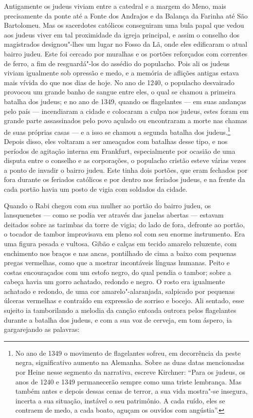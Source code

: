 Antigamente os judeus viviam entre a catedral e a margem do Meno, mais
precisamente da ponte até a Fonte dos Andrajos e da Balança da Farinha
até São Bartolomeu. Mas os sacerdotes católicos conseguiram uma bula
papal que vedou aos judeus viver em tal proximidade da igreja
principal, e assim o conselho dos magistrados designou"-lhes um lugar
no Fosso da Lã, onde eles edificaram o atual bairro judeu. Este foi
cercado por muralhas e os portões reforçados com correntes de ferro, a
fim de resguardá"-los do assédio do populacho. Pois ali os judeus
viviam igualmente sob opressão e medo, e a memória de aflições antigas
estava mais vívida do que nos dias de hoje. No ano de 1240, o populacho
desvairado provocou um grande banho de sangue entre eles, o qual se
chamou a primeira batalha dos judeus; e no ano de 1349, quando os
flagelantes --- em suas andanças pelo país --- incendiaram a cidade e
colocaram a culpa nos judeus, estes foram em grande parte assassinados
pelo povo açulado ou encontraram a morte nas chamas de suas próprias
casas ­--- e a isso se chamou a segunda batalha dos
judeus.\footnote{ No ano
de 1349 o movimento de flagelantes sofreu, em decorrência da peste
negra, significativo aumento na Alemanha. Sobre as duas datas
mencionadas por Heine nesse segmento da narrativa, escreve Kirchner:
``Para os judeus, os anos de 1240 e 1349 permanecerão sempre como uma
triste lembrança. Mas também antes e depois dessas cenas de terror, a
sua vida mostra"-se insegura, incerta a sua situação, instável o seu
patrimônio. A cada ruído, eles se contraem de medo, a cada boato,
aguçam os ouvidos com angústia''.}
 Depois disso, eles voltaram a ser ameaçados com batalhas desse tipo, e
nos períodos de agitação interna em Frankfurt, especialmente por
ocasião de uma disputa entre o conselho e as corporações, o populacho
cristão esteve várias vezes a ponto de invadir o bairro judeu. Este
tinha dois portões, que eram fechados por fora durante os feriados
católicos e por dentro nos feriados judeus, e na frente da cada portão
havia um posto de vigia com soldados da cidade.

Quando o Rabi chegou com sua mulher ao portão do bairro judeu, os
lansquenetes --- como se podia ver através das janelas abertas --- estavam
deitados sobre as tarimbas da torre de vigia; do lado de fora, defronte
ao portão, o tocador de tambor improvisava em pleno sol com seu enorme
instrumento. Era uma figura pesada e vultosa. Gibão e calças em tecido
amarelo reluzente, com enchimento nos braços e nas ancas, pontilhado de
cima a baixo com pequenas pregas vermelhas, como que a mostrar
incontáveis línguas humanas. Peito e costas encouraçados com um estofo
negro, do qual pendia o tambor; sobre a cabeça havia um gorro achatado,
redondo e negro. O rosto era igualmente achatado e redondo, de uma cor
amarelo"-alaranjada, salpicado por pequenas úlceras vermelhas e
contraído em expressão de sorriso e bocejo. Ali sentado, esse sujeito
ia tamborilando a melodia da canção entoada outrora pelos flagelantes
durante a batalha dos judeus, e com a sua voz de cerveja, em tom
áspero, ia gargarejando as palavras:

